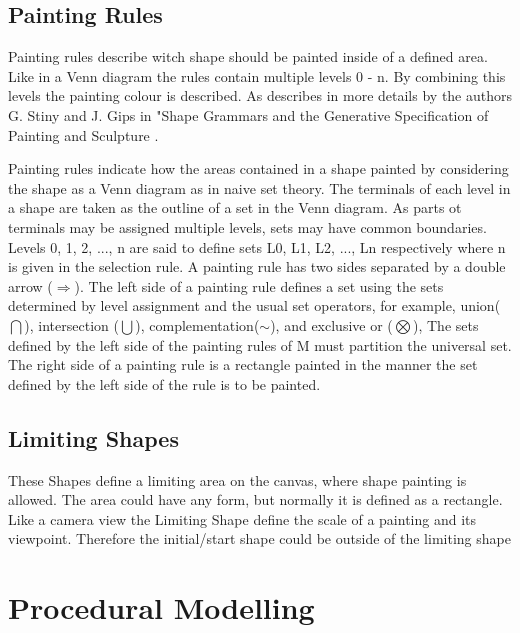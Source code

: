 \documentclass[11pt, a4paper]{report}
\begin{document}
\subsection{Painting Rules}
Painting rules describe witch shape should be painted inside of a defined area. Like in a Venn diagram the rules contain multiple levels 0 - n. By combining this levels the painting colour is described. As describes in more details by the authors G. Stiny and J. Gips in "Shape Grammars and the Generative Specification of Painting and Sculpture \citep{shapeGrammars:1972}.
\begin{displayquote}
    Painting rules indicate how the areas contained in a shape painted by considering the shape as a Venn diagram as in naive set theory. The terminals of each level in a shape are taken as the outline of a set in the Venn diagram. As parts ot terminals may be assigned multiple levels, sets may have common boundaries. Levels 0, 1, 2, ..., n are said to define sets L0, L1, L2, ..., Ln respectively where n is given in the selection rule.
    \newline
    A painting rule has two sides separated by a double arrow ($\Rightarrow$). The left side of a painting rule defines a set using the sets determined by level assignment and the usual set operators, for example, union($\bigcap$), intersection ($\bigcup$), complementation($\sim$), and exclusive or ($\bigotimes$), The sets defined by the left side of the painting rules of M must partition the universal set. The right side of a painting rule is a rectangle painted in the manner the set defined by the left side of the rule is to be painted.
\end{displayquote}

\subsection{Limiting Shapes}
These Shapes define a limiting area on the canvas, where shape painting is allowed. 
The area could have any form, but normally it is defined as a rectangle. Like a camera view the Limiting Shape define the scale of a painting and its viewpoint. Therefore the initial/start shape could be outside of the limiting shape 



\pagebreak
\section{Procedural Modelling}

\pagebreak
\end{document}

